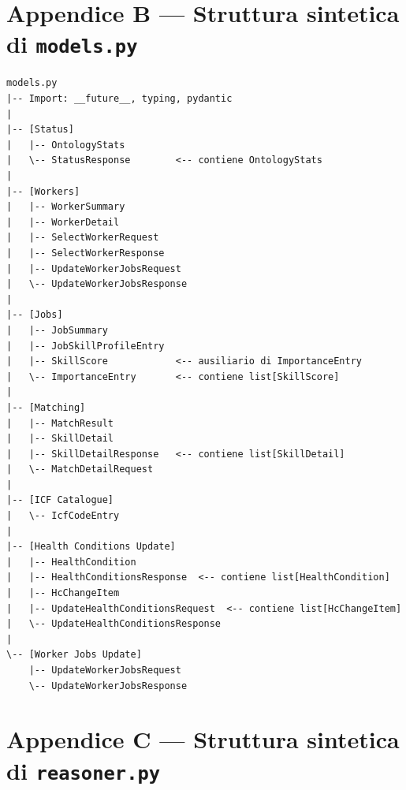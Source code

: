 \documentclass[a4paper,12pt]{article}
\begin{document}
\section*{Appendice B --- Struttura sintetica di \texttt{models.py}}

\begin{lstlisting}[caption={Pseudo-outline di \texttt{models.py}.}, numbers=none]
models.py
|-- Import: __future__, typing, pydantic
|
|-- [Status]
|   |-- OntologyStats
|   \-- StatusResponse        <-- contiene OntologyStats
|
|-- [Workers]
|   |-- WorkerSummary
|   |-- WorkerDetail
|   |-- SelectWorkerRequest
|   |-- SelectWorkerResponse
|   |-- UpdateWorkerJobsRequest
|   \-- UpdateWorkerJobsResponse
|
|-- [Jobs]
|   |-- JobSummary
|   |-- JobSkillProfileEntry
|   |-- SkillScore            <-- ausiliario di ImportanceEntry
|   \-- ImportanceEntry       <-- contiene list[SkillScore]
|
|-- [Matching]
|   |-- MatchResult
|   |-- SkillDetail
|   |-- SkillDetailResponse   <-- contiene list[SkillDetail]
|   \-- MatchDetailRequest
|
|-- [ICF Catalogue]
|   \-- IcfCodeEntry
|
|-- [Health Conditions Update]
|   |-- HealthCondition
|   |-- HealthConditionsResponse  <-- contiene list[HealthCondition]
|   |-- HcChangeItem
|   |-- UpdateHealthConditionsRequest  <-- contiene list[HcChangeItem]
|   \-- UpdateHealthConditionsResponse
|
\-- [Worker Jobs Update]
    |-- UpdateWorkerJobsRequest
    \-- UpdateWorkerJobsResponse
\end{lstlisting}

\section*{Appendice C --- Struttura sintetica di \texttt{reasoner.py}}
\end{document}
